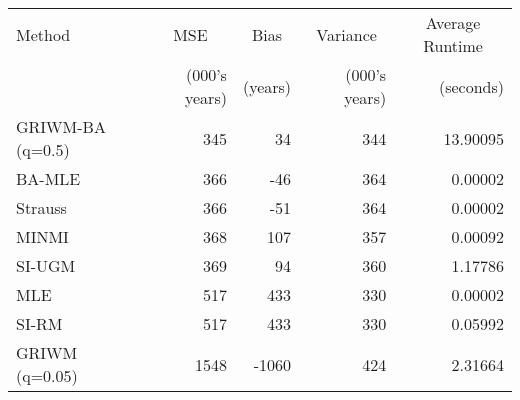
\begin{tabular}{lrrrr}
\toprule
\multicolumn{1}{l}{Method} & \multicolumn{1}{c}{MSE} & \multicolumn{1}{c}{Bias} & \multicolumn{1}{c}{Variance} & \multicolumn{1}{c}{Average Runtime} \\
 & (000's years) & (years) & (000's years) & (seconds)\\
\midrule
GRIWM-BA (q=0.5) & 345 & 34 & 344 & 13.90095\\
BA-MLE & 366 & -46 & 364 & 0.00002\\
Strauss & 366 & -51 & 364 & 0.00002\\
MINMI & 368 & 107 & 357 & 0.00092\\
SI-UGM & 369 & 94 & 360 & 1.17786\\
\addlinespace
MLE & 517 & 433 & 330 & 0.00002\\
SI-RM & 517 & 433 & 330 & 0.05992\\
GRIWM (q=0.05) & 1548 & -1060 & 424 & 2.31664\\
\bottomrule
\end{tabular}
